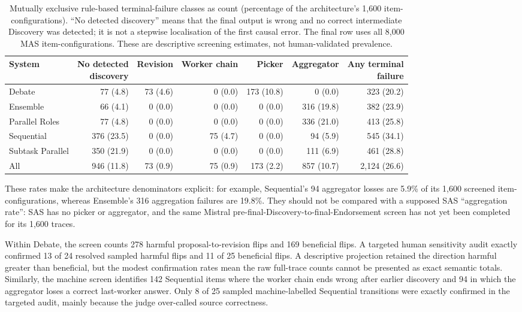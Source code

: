 \begin{table}[htbp]
  \centering
  \caption[Machine-screened terminal-failure attribution]{Mutually exclusive rule-based terminal-failure classes as count (percentage of the architecture's 1,600 item-configurations). ``No detected discovery'' means that the final output is wrong and no correct intermediate Discovery was detected; it is not a stepwise localisation of the first causal error. The final row uses all 8,000 MAS item-configurations. These are descriptive screening estimates, not human-validated prevalence.}
  \label{tab:first-error}
  \scriptsize
  \setlength{\tabcolsep}{2.5pt}
  \begin{tabular}{@{}lrrrrrr@{}}
    \toprule
    System & \shortstack{No detected\\discovery} & Revision & Worker chain & Picker & Aggregator & \shortstack{Any terminal\\failure} \\
    \midrule
    Debate & 77 (4.8) & 73 (4.6) & 0 (0.0) & 173 (10.8) & 0 (0.0) & 323 (20.2) \\
    Ensemble & 66 (4.1) & 0 (0.0) & 0 (0.0) & 0 (0.0) & 316 (19.8) & 382 (23.9) \\
    Parallel Roles & 77 (4.8) & 0 (0.0) & 0 (0.0) & 0 (0.0) & 336 (21.0) & 413 (25.8) \\
    Sequential & 376 (23.5) & 0 (0.0) & 75 (4.7) & 0 (0.0) & 94 (5.9) & 545 (34.1) \\
    Subtask Parallel & 350 (21.9) & 0 (0.0) & 0 (0.0) & 0 (0.0) & 111 (6.9) & 461 (28.8) \\
    \midrule
    All & 946 (11.8) & 73 (0.9) & 75 (0.9) & 173 (2.2) & 857 (10.7) & 2,124 (26.6) \\
    \bottomrule
  \end{tabular}
\end{table}

These rates make the architecture denominators explicit: for example, Sequential's 94 aggregator losses are 5.9\% of its 1,600 screened item-configurations, whereas Ensemble's 316 aggregation failures are 19.8\%. They should not be compared with a supposed SAS ``aggregation rate'': SAS has no picker or aggregator, and the same Mistral pre-final-Discovery-to-final-Endorsement screen has not yet been completed for its 1,600 traces.

Within Debate, the screen counts 278 harmful proposal-to-revision flips and 169 beneficial flips. A targeted human sensitivity audit exactly confirmed 13 of 24 resolved sampled harmful flips and 11 of 25 beneficial flips. A descriptive projection retained the direction harmful greater than beneficial, but the modest confirmation rates mean the raw full-trace counts cannot be presented as exact semantic totals. Similarly, the machine screen identifies 142 Sequential items where the worker chain ends wrong after earlier discovery and 94 in which the aggregator loses a correct last-worker answer. Only 8 of 25 sampled machine-labelled Sequential \ctow{} transitions were exactly confirmed in the targeted audit, mainly because the judge over-called source correctness.

